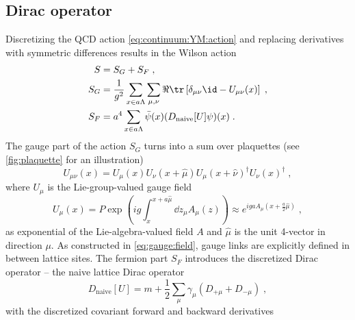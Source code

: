 \subsection{Dirac operator}

Discretizing the QCD action \cref{eq:continuum:YM:action} and replacing derivatives with symmetric differences results in the Wilson action~\cite{Gattringer:2010zz}
\begin{align}
S &= S_G + S_F \;, \\
S_G &= \frac{1}{g^2} \sum_{x \in a \Lambda} \sum_{\mu, \nu} \Re \tr \left[ \delta_{\mu \nu} \id - U_{\mu \nu}(x) \right] \;, \label{eq:wilson:action:gauge} \\
S_F &= a^4 \sum_{x \in a \Lambda} \bar{\psi}(x) (D_{\text{naive}}[U] \psi)(x) \;.
\end{align}
The gauge part of the action $S_G$ turns into a sum over plaquettes (see \cref{fig:plaquette} for an illustration)
\begin{equation} \label{eq:plaquette}
U_{\mu \nu}(x)
= U_{\mu}(x) U_{\nu}(x + \hat{\mu}) U_{\mu}(x + \hat{\nu})^{\dagger} U_{\nu}(x)^{\dagger} \;,
\end{equation}
where $U_{\mu}$ is the Lie-group-valued gauge field
\begin{equation} \label{eq:gauge:field}
U_{\mu}(x)
= P \exp(i g \int_x^{x + a \hat{\mu}} \dd z_{\mu} A_{\mu}(z) )
\approx e^{i g a A_{\mu}(x + \frac{a}{2} \hat{\mu})} \;,
\end{equation}
as exponential of the Lie-algebra-valued field $A$ and $\hat{\mu}$ is the unit 4-vector in direction $\mu$.
As constructed in \cref{eq:gauge:field}, gauge links are explicitly defined in between lattice sites.
The fermion part $S_F$ introduces the discretized Dirac operator -- the naive lattice Dirac operator
\begin{equation} \label{eq:D:naive}
D_{\text{naive}}[U] = m + \frac{1}{2} \sum_{\mu} \gamma_{\mu} \left( D_{+\mu} + D_{- \mu} \right) \;,
\end{equation}
with the discretized covariant forward and backward derivatives
